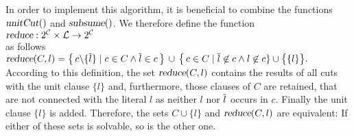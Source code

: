 In order to implement this algorithm, it is beneficial to combine the functions
 $\textsl{unitCut}()$ and $\textsl{subsume}()$.  We therefore define the function
\\[0.2cm]
\hspace*{1.3cm}
$\textsl{reduce}: 2^\mathcal{C} \times \mathcal{L} \rightarrow 2^\mathcal{C}$
\\[0.2cm]
as follows 
\\[0.2cm]
\hspace*{1.3cm}
$\textsl{reduce}(C,l)  = 
 \bigl\{\, c \backslash \{\overline{l}\} \;|\; c \in C \wedge \overline{l} \in c \,\bigr\} 
       \,\cup\, \bigl\{\, c \in C \mid \overline{l} \not\in c \wedge l \not\in c \} \cup \bigl\{\{l\}\bigr\}.
$
\\[0.2cm]
According to this definition, the set $\textsl{reduce}(C,l)$
contains the results of all cuts with the unit clause  $\{l\}$ and, furthermore, those
clauses of $C$ are retained, that are not connected with the literal $l$ as neither $l$ nor
$\overline{l}$ occurs in $c$.  Finally the unit clause $\{l\}$ is added.
Therefore, the sets  $C \cup \{l\}$  and $\textsl{reduce}(C,l)$ are equivalent:  If either
of these sets is solvable, so is the other one.



